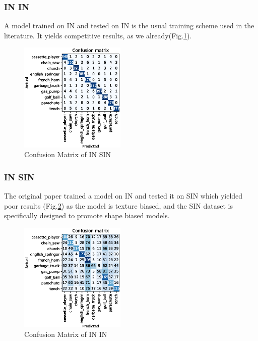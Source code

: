\documentclass{article}
\begin{document}
\subsubsection{IN \texorpdfstring{\textrightarrow} .IN}
A model trained on IN and tested on IN is the usual training scheme used in the literature.
It yields competitive results, as we already(Fig.\ref{fig:cm_in-in}).

\begin{figure}[h!]
  \includegraphics[width = 0.45\textwidth]{imgs/in/in-in/in-in_confusion_matrix_0.963.eps}
  \caption{Confusion Matrix of IN \texorpdfstring{\textrightarrow} .SIN}
  \label{fig:cm_in-in}
\end{figure}

\subsubsection{IN \texorpdfstring{\textrightarrow} .SIN}



The original paper trained a model on IN and tested it on SIN which yielded poor results (Fig.\ref{fig:cm_in-sin}) as 
the model is texture biased, and the SIN dataset is specifically designed to promote shape biased models.

\begin{figure}[h!]
  \includegraphics[width = 0.45\textwidth]{imgs/in/in-sin/in-sin_confusion_matrix_0.313.eps}
  \caption{Confusion Matrix of IN \texorpdfstring{\textrightarrow} .IN}
  \label{fig:cm_in-sin}
\end{figure}
\end{document}
